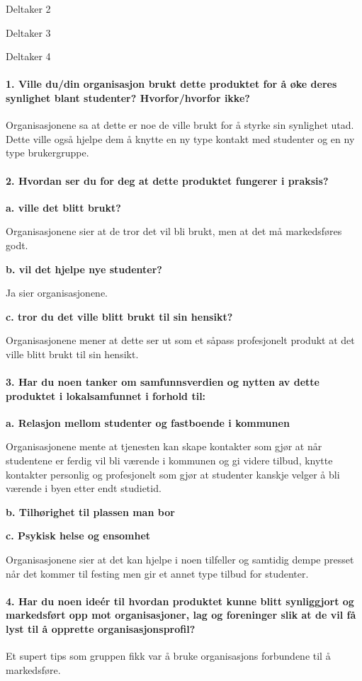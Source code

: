 Deltaker 2

Deltaker 3

Deltaker 4

\paragraph{1. Ville du/din organisasjon brukt dette produktet for å øke deres synlighet blant studenter? Hvorfor/hvorfor ikke?}
Organisasjonene sa at dette er noe de ville brukt for å styrke sin synlighet utad. Dette ville også hjelpe dem å knytte en ny type kontakt med studenter og en ny type brukergruppe.

\paragraph{2. Hvordan ser du for deg at dette produktet fungerer i praksis?}
{\bf a. ville det blitt brukt?}

Organisasjonene sier at de tror det vil bli brukt, men at det må markedsføres godt.

{\bf b. vil det hjelpe nye studenter?}

Ja sier organisasjonene.

{\bf c. tror du det ville blitt brukt til sin hensikt?}

Organisasjonene mener at dette ser ut som et såpass profesjonelt produkt at det ville blitt brukt til sin hensikt.

\paragraph{3. Har du noen tanker om samfunnsverdien og nytten av dette produktet i lokalsamfunnet i forhold til:}
{\bf a. Relasjon mellom studenter og fastboende i kommunen}

Organisasjonene mente at tjenesten kan skape kontakter som gjør at når studentene er ferdig vil bli værende i kommunen og gi videre tilbud, knytte kontakter personlig og profesjonelt som gjør at studenter kanskje velger å bli værende i byen etter endt studietid.

{\bf b. Tilhørighet til plassen man bor}



{\bf c. Psykisk helse og ensomhet}

Organisasjonene sier at det kan hjelpe i noen tilfeller og samtidig dempe presset når det kommer til festing men gir et annet type tilbud for studenter.

\paragraph{4. Har du noen ideér til hvordan produktet kunne blitt synliggjort og markedsført opp mot organisasjoner, lag og foreninger slik at de vil få lyst til å opprette organisasjonsprofil?}
Et supert tips som gruppen fikk var å bruke organisasjons forbundene til å markedsføre.

